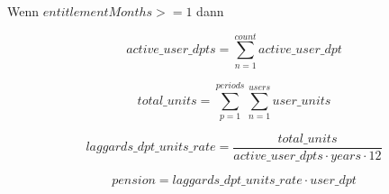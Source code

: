 Wenn $entitlementMonths >= 1$ dann 

\begin{equation*}
	active\_user\_dpts = 
	\sum_{n=1}^{count} active\_user\_dpt
\end{equation*}

\begin{equation*}
	total\_units = 	
	\sum_{p=1}^{periods} \sum_{n=1}^{users} user\_units	
\end{equation*}

\begin{equation*}
	laggards\_dpt\_units\_rate = 	
	\frac{total\_units} 
	{active\_user\_dpts \cdot years \cdot 12}		
\end{equation*}

\begin{equation*}
	pension = laggards\_dpt\_units\_rate \cdot user\_dpt
\end{equation*}